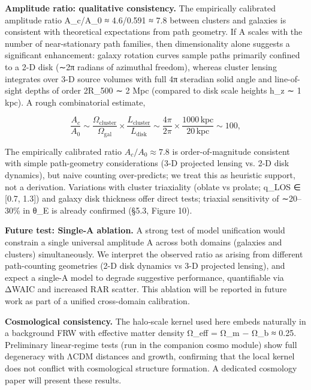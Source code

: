 \documentclass[11pt,a4paper]{article}
\begin{document}
\textbf{Amplitude ratio: qualitative consistency.} The empirically calibrated amplitude ratio A\_c/A\_0 ≈ 4.6/0.591 ≈ 7.8 between clusters and galaxies is consistent with theoretical expectations from path geometry. If A scales with the number of near-stationary path families, then dimensionality alone suggests a significant enhancement: galaxy rotation curves sample paths primarily confined to a 2-D disk (∼2π radians of azimuthal freedom), whereas cluster lensing integrates over 3-D source volumes with full 4π steradian solid angle and line-of-sight depths of order 2R\_500 ∼ 2 Mpc (compared to disk scale heights h\_z ∼ 1 kpc). A rough combinatorial estimate,


\begin{equation}
\frac{A_c}{A_0} \sim \frac{\Omega_{\mathrm{cluster}}}{\Omega_{\mathrm{gal}}} \times \frac{L_{\mathrm{cluster}}}{L_{\mathrm{disk}}} \sim \frac{4\pi}{2\pi} \times \frac{1000\,\mathrm{kpc}}{20\,\mathrm{kpc}} \sim 100,
\end{equation}


The empirically calibrated ratio $A_c/A_0 \approx 7.8$ is order-of-magnitude consistent with simple path-geometry considerations (3-D projected lensing vs. 2-D disk dynamics), but naive counting over-predicts; we treat this as heuristic support, not a derivation. Variations with cluster triaxiality (oblate vs prolate; q\_LOS ∈ [0.7, 1.3]) and galaxy disk thickness offer direct tests; triaxial sensitivity of ∼20–30\% in θ\_E is already confirmed (§5.3, Figure 10).


\textbf{Future test: Single-A ablation.} A strong test of model unification would constrain a single universal amplitude A across both domains (galaxies and clusters) simultaneously. We interpret the observed ratio as arising from different path-counting geometries (2-D disk dynamics vs 3-D projected lensing), and expect a single-A model to degrade suggestive performance, quantifiable via ΔWAIC and increased RAR scatter. This ablation will be reported in future work as part of a unified cross-domain calibration.


\textbf{Cosmological consistency.} The halo‑scale kernel used here embeds naturally in a background FRW with effective matter density Ω\_eff = Ω\_m − Ω\_b ≈ 0.25. Preliminary linear‑regime tests (run in the companion cosmo module) show full degeneracy with ΛCDM distances and growth, confirming that the local kernel does not conflict with cosmological structure formation. A dedicated cosmology paper will present these results.
\end{document}
